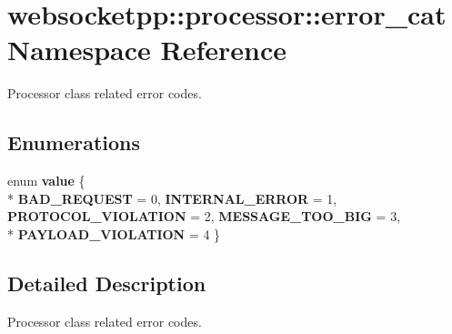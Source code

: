 \hypertarget{namespacewebsocketpp_1_1processor_1_1error__cat}{}\section{websocketpp\+:\+:processor\+:\+:error\+\_\+cat Namespace Reference}
\label{namespacewebsocketpp_1_1processor_1_1error__cat}


Processor class related error codes.  


\subsection*{Enumerations}
\begin{DoxyCompactItemize}
\item 
enum {\bfseries value} \{ \\*
{\bfseries B\+A\+D\+\_\+\+R\+E\+Q\+U\+E\+ST} = 0, 
{\bfseries I\+N\+T\+E\+R\+N\+A\+L\+\_\+\+E\+R\+R\+OR} = 1, 
{\bfseries P\+R\+O\+T\+O\+C\+O\+L\+\_\+\+V\+I\+O\+L\+A\+T\+I\+ON} = 2, 
{\bfseries M\+E\+S\+S\+A\+G\+E\+\_\+\+T\+O\+O\+\_\+\+B\+IG} = 3, 
\\*
{\bfseries P\+A\+Y\+L\+O\+A\+D\+\_\+\+V\+I\+O\+L\+A\+T\+I\+ON} = 4
 \}\hypertarget{namespacewebsocketpp_1_1processor_1_1error__cat_ae83487c9a0c1462b790898dfcb4b174e}{}\label{namespacewebsocketpp_1_1processor_1_1error__cat_ae83487c9a0c1462b790898dfcb4b174e}

\end{DoxyCompactItemize}


\subsection{Detailed Description}
Processor class related error codes. 
